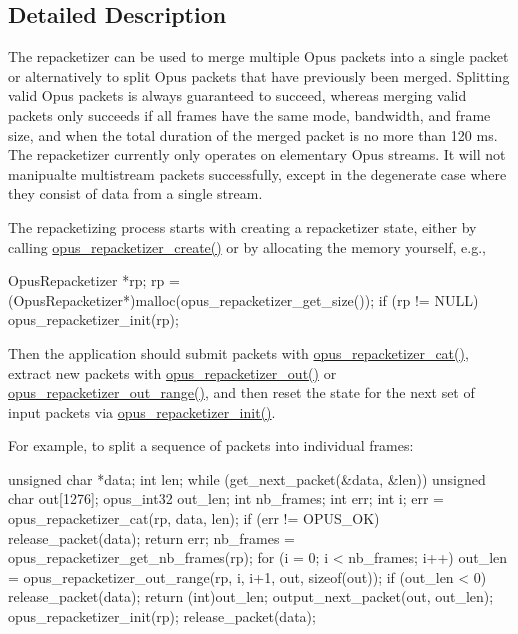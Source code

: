 \subsection{Detailed Description}
The repacketizer can be used to merge multiple Opus packets into a single packet or alternatively to split Opus packets that have previously been merged. Splitting valid Opus packets is always guaranteed to succeed, whereas merging valid packets only succeeds if all frames have the same mode, bandwidth, and frame size, and when the total duration of the merged packet is no more than 120 ms. The repacketizer currently only operates on elementary Opus streams. It will not manipualte multistream packets successfully, except in the degenerate case where they consist of data from a single stream.

The repacketizing process starts with creating a repacketizer state, either by calling \hyperlink{group__opus__repacketizer_ga6f8813666ef851550ecf8658a731ff7d}{opus\_\-repacketizer\_\-create()} or by allocating the memory yourself, e.g., 
\begin{DoxyCode}
 OpusRepacketizer *rp;
 rp = (OpusRepacketizer*)malloc(opus_repacketizer_get_size());
 if (rp != NULL)
     opus_repacketizer_init(rp);
\end{DoxyCode}


Then the application should submit packets with \hyperlink{group__opus__repacketizer_ga2840dd56bfa37f8c6874355b9ce8fb46}{opus\_\-repacketizer\_\-cat()}, extract new packets with \hyperlink{group__opus__repacketizer_ga19ff1e91a8fa652380f972a224a26481}{opus\_\-repacketizer\_\-out()} or \hyperlink{group__opus__repacketizer_gac591b550d92125b4abfa11a4b609f51f}{opus\_\-repacketizer\_\-out\_\-range()}, and then reset the state for the next set of input packets via \hyperlink{group__opus__repacketizer_gab42ff7c3f8a49ff5029fcf60f3b853f0}{opus\_\-repacketizer\_\-init()}.

For example, to split a sequence of packets into individual frames: 
\begin{DoxyCode}
 unsigned char *data;
 int len;
 while (get_next_packet(&data, &len))
 {
   unsigned char out[1276];
   opus_int32 out_len;
   int nb_frames;
   int err;
   int i;
   err = opus_repacketizer_cat(rp, data, len);
   if (err != OPUS_OK)
   {
     release_packet(data);
     return err;
   }
   nb_frames = opus_repacketizer_get_nb_frames(rp);
   for (i = 0; i < nb_frames; i++)
   {
     out_len = opus_repacketizer_out_range(rp, i, i+1, out, sizeof(out));
     if (out_len < 0)
     {
        release_packet(data);
        return (int)out_len;
     }
     output_next_packet(out, out_len);
   }
   opus_repacketizer_init(rp);
   release_packet(data);
 }
\end{DoxyCode}


